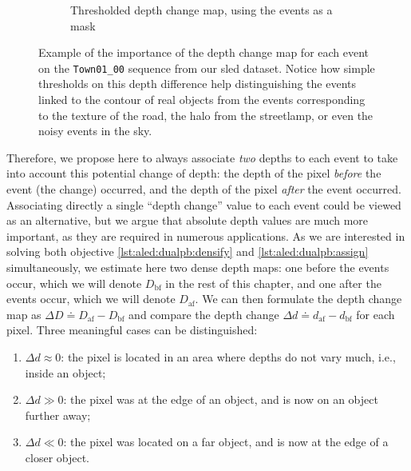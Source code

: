 \begin{figure}
\begin{subfigure}{\linewidth}
    \caption{Thresholded depth change map, using the events as a mask}
  \end{subfigure}
  \cprotect\caption{Example of the importance of the depth change map for each event on the \verb|Town01_00| sequence from our \acrshort{sled} dataset. Notice how simple thresholds on this depth difference help distinguishing the events linked to the contour of real objects from the events corresponding to the texture of the road, the halo from the streetlamp, or even the noisy events in the sky.}\label{fig:aled:depth_difference_example}
\end{figure}

Therefore, we propose here to always associate \textit{two} depths to each event to take into account this potential change of depth: the depth of the pixel \textit{before} the event (the change) occurred, and the depth of the pixel \textit{after} the event occurred. Associating directly a single ``depth change'' value to each event could be viewed as an alternative, but we argue that absolute depth values are much more important, as they are required in numerous applications. As we are interested in solving both objective \ref{lst:aled:dualpb:densify} and \ref{lst:aled:dualpb:assign} simultaneously, we estimate here two dense depth maps: one before the events occur, which we will denote \(D_\text{bf}\) in the rest of this chapter, and one after the events occur, which we will denote \(D_\text{af}\). We can then formulate the depth change map as \(\Delta D \doteq D_\text{af}-D_\text{bf}\) and compare the depth change \(\Delta d \doteq d_\text{af}-d_\text{bf}\) for each pixel. Three meaningful cases can be distinguished:
\begin{enumerate}
  \item \(\Delta d \approx 0\): the pixel is located in an area where depths do not vary much, i.e., inside an object;
  \item \(\Delta d \gg 0\): the pixel was at the edge of an object, and is now on an object further away;
  \item \(\Delta d \ll 0\): the pixel was located on a far object, and is now at the edge of a closer object.
\end{enumerate}

